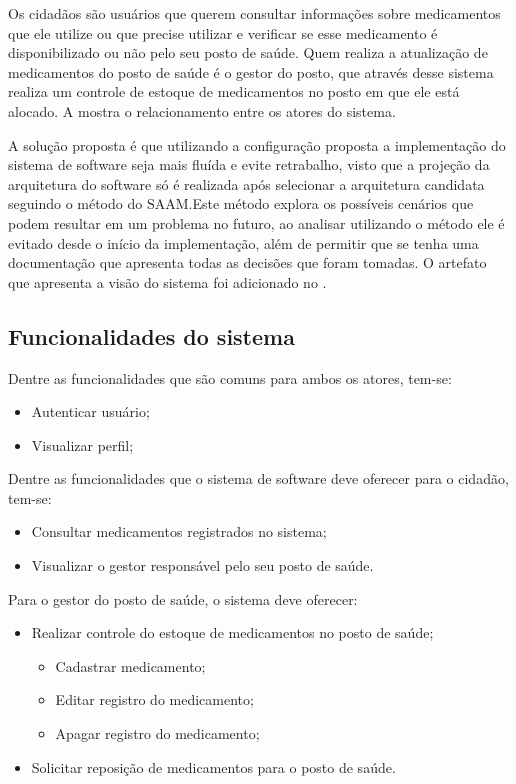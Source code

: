 Os cidadãos são usuários que querem consultar informações sobre medicamentos que ele utilize ou que precise utilizar e verificar se esse medicamento é disponibilizado ou não pelo seu posto de saúde. Quem realiza a atualização de medicamentos do posto de saúde é o gestor do posto, que através desse sistema realiza um controle de estoque de medicamentos no posto em que ele está alocado. A  mostra o relacionamento entre os atores do sistema.

%

A solução proposta é que utilizando a configuração proposta a implementação do sistema de software seja mais fluída e evite retrabalho, visto que a projeção da arquitetura do software só é realizada após selecionar a arquitetura candidata seguindo o método do \acrfull{SAAM}.Este método explora os possíveis cenários que podem resultar em um problema no futuro, ao analisar utilizando o método ele é evitado desde o início da implementação, além de permitir que se tenha uma documentação que apresenta todas as decisões que foram tomadas. O artefato que apresenta a visão do sistema foi adicionado no .

\subsection{Funcionalidades do sistema}

Dentre as funcionalidades que são comuns para ambos os atores, tem-se:

\begin{itemize}
    \item Autenticar usuário;
    \item Visualizar perfil;
\end{itemize}

Dentre as funcionalidades que o sistema de software deve oferecer para o cidadão, tem-se:
 
 \begin{itemize}
     \item Consultar medicamentos registrados no sistema;
     \item Visualizar o gestor responsável pelo seu posto de saúde.
    \end{itemize}
 
Para o gestor do posto de saúde, o sistema deve oferecer:
 \begin{itemize}
  \item Realizar controle do estoque de medicamentos no posto de saúde;
  \begin{itemize}
     \item Cadastrar medicamento;
     \item Editar registro do medicamento;
     \item Apagar registro do medicamento;
  \end{itemize}
     \item Solicitar reposição de medicamentos para o posto de saúde.
 \end{itemize}


